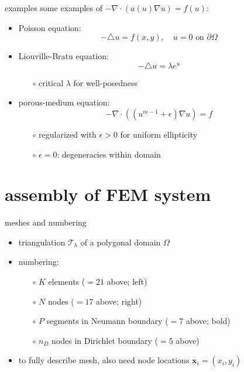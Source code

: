 \documentclass[hide notes,intlimits,usenames,dvipsnames]{beamer}
\newcommand{\bx}{\mathbf{x}}
\newcommand{\Div}{\nabla\cdot}
\newcommand{\eps}{\epsilon}
\newcommand{\grad}{\nabla}
\begin{document}
\begin{frame}{examples}
some examples of $- \Div \left(a(u) \grad u\right) = f(u)$:
\begin{itemize}
\item Poisson equation:
    $$-\triangle u=f(x,y), \quad u=0 \text{ on } \partial \Omega$$
\item Liouville-Bratu equation:
    $$-\triangle u = \lambda e^u$$

\vspace{-3mm}
    \begin{itemize}
    \item[$\circ$] critical $\lambda$ for well-posedness
    \end{itemize}
\item porous-medium equation:
    $$-\Div\left((u^{m-1} + \eps)\grad u\right) = f$$

\vspace{-3mm}
    \begin{itemize}
    \item[$\circ$] regularized with $\eps>0$ for uniform ellipticity
    \item[$\circ$] $\eps=0$: degeneracies within domain
    \end{itemize}
\end{itemize}
\end{frame}




\section{assembly of FEM system}

\begin{frame}{meshes and numbering}
\mbox{ \quad }

\begin{itemize}
\item triangulation $\mathcal{T}_h$ of a polygonal domain $\Omega$
\item numbering:
    \begin{itemize}
    \item[$\circ$] $K$ elements ($=21$ above; left)
    \item[$\circ$] $N$ nodes ($=17$ above; right)
    \item[$\circ$] $P$ segments in Neumann boundary ($=7$ above; bold)
    \item[$\circ$] $n_D$ nodes in Dirichlet boundary ($=5$ above)
    \end{itemize}
\item to fully describe mesh, also need node locations $\bx_i=(x_i,y_i)$
\end{itemize}
\end{frame}
\end{document}

